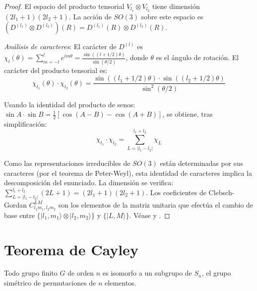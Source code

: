 \begin{proof}
El espacio del producto tensorial $V_{l_1} \otimes V_{l_2}$ tiene dimensión $(2l_1+1)(2l_2+1)$. La acción de $SO(3)$ sobre este espacio es $(D^{(l_1)} \otimes D^{(l_2)})(R) = D^{(l_1)}(R) \otimes D^{(l_2)}(R)$.

\textit{Análisis de caracteres}: El carácter de $D^{(l)}$ es $\chi_l(\theta) = \sum_{m=-l}^{l} e^{im\theta} = \frac{\sin((l+1/2)\theta)}{\sin(\theta/2)}$, donde $\theta$ es el ángulo de rotación. El carácter del producto tensorial es:
\[
\chi_{l_1}(\theta) \cdot \chi_{l_2}(\theta) = \frac{\sin((l_1+1/2)\theta) \cdot \sin((l_2+1/2)\theta)}{\sin^2(\theta/2)}
\]

Usando la identidad del producto de senos: $\sin A \cdot \sin B = \frac{1}{2}[\cos(A-B) - \cos(A+B)]$, se obtiene, tras simplificación:
\[
\chi_{l_1} \cdot \chi_{l_2} = \sum_{L=|l_1-l_2|}^{l_1+l_2} \chi_L
\]

Como las representaciones irreducibles de $SO(3)$ están determinadas por sus caracteres (por el teorema de Peter-Weyl), esta identidad de caracteres implica la descomposición del enunciado. La dimensión se verifica: $\sum_{L=|l_1-l_2|}^{l_1+l_2}(2L+1) = (2l_1+1)(2l_2+1)$. Los coeficientes de Clebsch-Gordan $C_{l_1 m_1, l_2 m_2}^{LM}$ son los elementos de la matriz unitaria que efectúa el cambio de base entre $\{|l_1, m_1\rangle \otimes |l_2, m_2\rangle\}$ y $\{|L, M\rangle\}$. Véase \citep[Capítulo~8]{Serre1977} y \citep[Capítulo~11]{Fulton1991}.
\end{proof}

\section{Teorema de Cayley}\label{sec:cayley}

\begin{theorem}\label{thm:cayley_apendice}
Todo grupo finito $G$ de orden $n$ es isomorfo a un subgrupo de $S_n$, el grupo simétrico de permutaciones de $n$ elementos.
\end{theorem}

